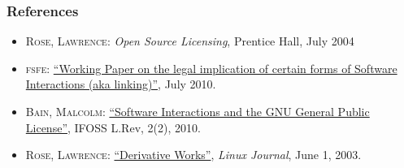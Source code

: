 \documentclass{beamer}
\begin{document}
\begin{frame}
\frametitle{References}

\begin{itemize}
\item \textsc{Rose, Lawrence}: \textit{Open Source Licensing}, Prentice Hall, July 2004 
\item \textsc{fsfe}: \href{https://wiki.fsfe.org/EuropeanLegalNetwork/LinkingDocument?action=AttachFile&do=view&target=software_interactions.pdf}{``Working Paper on the legal implication of certain forms of Software Interactions (aka linking)''}, July 2010.
\item \textsc{Bain, Malcolm}: \href{http://www.ifosslr.org/ifosslr/article/view/44}{``Software Interactions and the GNU General Public License''}, IFOSS L.Rev, 2(2), 2010.
\item \textsc{Rose, Lawrence}: \href{http://www.linuxjournal.com/article/6366}{``Derivative Works''}, \textit{Linux Journal}, June 1, 2003.
\end{itemize}

\end{frame}




\end{document}
